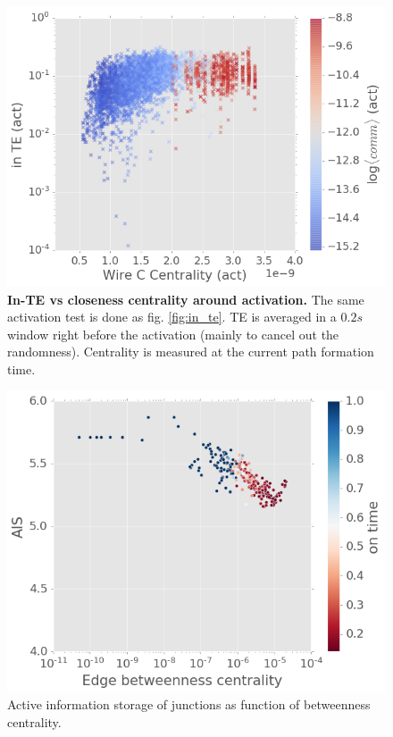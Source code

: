 \documentclass[%
 reprint,
 amsmath,amssymb,
 aps,
floatfix,
]{revtex4-2}
\begin{document}
\begin{figure}[h]
	\centering
	\includegraphics[width=1\linewidth]{figure/TE_cent_act}
	\caption{\textbf{In-TE vs closeness centrality around activation.} The same activation test is done as fig. \ref{fig:in_te}.	TE is averaged in a $0.2s$ window right before the activation (mainly to cancel out the randomness). Centrality is measured at the current path formation time.}
	\label{fig:TE_cent_act}
\end{figure}

\begin{figure}[h]
	\centering
	\includegraphics[width=1\linewidth]{figure/EC_AIS.png}
	\caption{Active information storage of junctions as function of betweenness centrality.}
	\label{fig:EC_AIS}
\end{figure}
\end{document}
